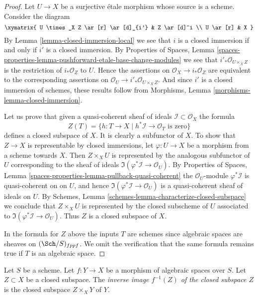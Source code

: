 \begin{proof}
Let $U \to X$ be a surjective \'etale morphism whose source is a scheme.
Consider the diagram
$$
\xymatrix{
U \times_X Z \ar[r] \ar[d]_{i'} & Z \ar[d]^i \\
U \ar[r] & X
}
$$
By
Lemma \ref{lemma-closed-immersion-local}
we see that $i$ is a closed immersion
if and only if $i'$ is a closed immersion. By
Properties of Spaces,
Lemma \ref{spaces-properties-lemma-pushforward-etale-base-change-modules}
we see that $i'_*\mathcal{O}_{U \times_X Z}$ is the restriction of
$i_*\mathcal{O}_Z$ to $U$. Hence the assertions on
$\mathcal{O}_X \to i_*\mathcal{O}_Z$ are equivalent to the
corresponding assertions on
$\mathcal{O}_U \to i'_*\mathcal{O}_{U \times_X Z}$.
And since $i'$ is a closed immersion of schemes, these results follow from
Morphisms, Lemma \ref{morphisms-lemma-closed-immersion}.

\medskip\noindent
Let us prove that given a quasi-coherent
sheaf of ideals $\mathcal{I} \subset \mathcal{O}_X$ the formula
$$
Z(T) = \{h : T \to X \mid h^*\mathcal{I} \to \mathcal{O}_T
\text{ is zero}\}
$$
defines a closed subspace of $X$. It is clearly a subfunctor of $X$.
To show that $Z \to X$ is representable by closed immersions, let
$\varphi : U \to X$ be a morphism from a scheme towards $X$. Then
$Z \times_X U$ is represented by the analogous subfunctor of $U$ corresponding
to the sheaf of ideals $\Im(\varphi^*\mathcal{I} \to \mathcal{O}_U)$. By
Properties of Spaces,
Lemma \ref{spaces-properties-lemma-pullback-quasi-coherent}
the $\mathcal{O}_U$-module $\varphi^*\mathcal{I}$ is quasi-coherent on
on $U$, and hence $\Im(\varphi^*\mathcal{I} \to \mathcal{O}_U)$
is a quasi-coherent sheaf of ideals on $U$. By
Schemes, Lemma \ref{schemes-lemma-characterize-closed-subspace}
we conclude that $Z \times_X U$ is represented by the closed subscheme
of $U$ associated to $\Im(\varphi^*\mathcal{I} \to \mathcal{O}_U)$.
Thus $Z$ is a closed subspace of $X$.

\medskip\noindent
In the formula for $Z$ above the inputs $T$ are schemes since algebraic
spaces are sheaves on $(\Sch/S)_{fppf}$. We omit the verification
that the same formula remains true if $T$ is an algebraic space.
\end{proof}

\begin{definition}
\label{definition-inverse-image-closed-subspace}
Let $S$ be a scheme. Let $f : Y \to X$ be a morphism of algebraic spaces
over $S$. Let $Z \subset X$ be a closed subspace. The
{\it inverse image $f^{-1}(Z)$ of the closed subspace $Z$}
is the closed subspace $Z \times_X Y$ of $Y$.
\end{definition}

